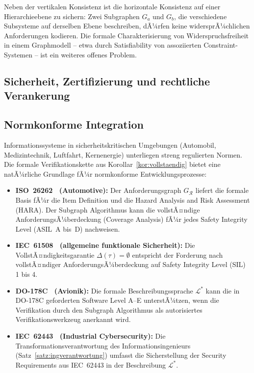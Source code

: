 ﻿\documentclass[a4paper,12pt]{report}
\theoremstyle{definition}
\begin{document}
Neben der vertikalen Konsistenz ist die horizontale Konsistenz auf einer Hierarchieebene
zu sichern: Zwei Subgraphen $G_a$ und $G_b$, die verschiedene Subsysteme auf derselben
Ebene beschreiben, dÃ¼rfen keine widersprÃ¼chlichen Anforderungen kodieren. Die formale
Charakterisierung von Widerspruchsfreiheit in einem Graphmodell -- etwa durch
Satisfiability von assoziierten Constraint-Systemen -- ist ein weiteres offenes Problem.

\subsection{Sicherheit, Zertifizierung und rechtliche Verankerung}

\subsection{Normkonforme Integration}

Informationssysteme in sicherheitskritischen Umgebungen (Automobil, Medizintechnik,
Luftfahrt, Kernenergie) unterliegen streng regulierten Normen.
Die formale Verifikationskette aus Korollar~\ref{kor:vollstaendig} bietet eine
natÃ¼rliche Grundlage fÃ¼r normkonforme Entwicklungsprozesse:

\begin{itemize}
  \item \textbf{ISO~26262~\cite{iso26262} (Automotive):}
        Der Anforderungsgraph $G_\mathcal{R}$ liefert die formale Basis fÃ¼r die
        Item Definition und die Hazard Analysis and Risk Assessment (HARA).
        Der Subgraph Algorithmus kann die vollstÃ¤ndige AnforderungsÃ¼berdeckung
        (Coverage Analysis) fÃ¼r jedes Safety Integrity Level (ASIL~A bis~D) nachweisen.
  \item \textbf{IEC~61508~\cite{iec61508} (allgemeine funktionale Sicherheit):}
        Die VollstÃ¤ndigkeitsgarantie $\Delta(\tau) = \emptyset$ entspricht der
        Forderung nach vollstÃ¤ndiger AnforderungsÃ¼berdeckung auf Safety Integrity
        Level (SIL) 1 bis 4.
  \item \textbf{DO-178C~\cite{do178c} (Avionik):}
        Die formale Beschreibungssprache $\mathcal{L}^*$ kann die in DO-178C
        geforderten Software Level A--E unterstÃ¼tzen, wenn die Verifikation durch
        den Subgraph Algorithmus als autorisiertes Verifikationswerkzeug anerkannt wird.
  \item \textbf{IEC~62443~\cite{iec62443} (Industrial Cybersecurity):}
        Die Transformationsverantwortung des Informationsingenieurs (Satz~\ref{satz:ingverantwortung})
        umfasst die Sicherstellung der Security Requirements aus IEC~62443 in der
        Beschreibung $\mathcal{L}^*$.
\end{itemize}
\end{document}
